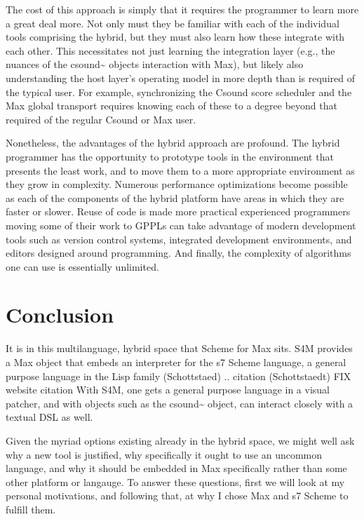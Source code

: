 \documentclass[letterpaper,10pt,english]{sphinxmanual}
\begin{document}
\sphinxAtStartPar
The cost of this approach is simply that it requires the programmer to learn
more \sphinxhyphen{} a great deal more. Not only must they be familiar with each of the individual
tools comprising the hybrid, but they must also learn how these integrate with each other.
This necessitates not just learning the integration layer (e.g., the nuances of the csound\textasciitilde{}
objects interaction with Max), but likely also understanding the host layer’s
operating model in more depth than is required of the typical user.
For example, synchronizing the Csound score scheduler and the Max global
transport requires knowing each of these to a degree beyond that required of the
regular Csound or Max user.

\sphinxAtStartPar
Nonetheless, the advantages of the hybrid approach are profound.
The hybrid programmer has the opportunity to prototype tools in the
environment that presents the least work, and to move them to a more
appropriate environment as they grow in complexity.
Numerous performance optimizations become possible as each of the
components of the hybrid platform have areas in which they are faster or slower.
Reuse of code is made more practical \sphinxhyphen{} experienced programmers
moving some of their work to GPPLs can take
advantage of modern development tools such as version control systems,
integrated development environments, and
editors designed around programming. And finally, the complexity
of algorithms one can use is essentially unlimited.


\section{Conclusion}
\label{\detokenize{background:conclusion}}
\sphinxAtStartPar
It is in this multi\sphinxhyphen{}language, hybrid space that Scheme for Max sits.
S4M provides a Max object that embeds an interpreter for
the s7 Scheme language, a general purpose language in the Lisp family (Schottstaed)
.. citation (Schottstaedt) FIX website citation
With S4M, one gets a general purpose language in a visual patcher, and
with objects such as the csound\textasciitilde{} object, can interact closely with
a textual DSL as well.

\sphinxAtStartPar
Given the myriad options existing already in the hybrid space,
we might well ask why a new tool is justified, why
specifically it ought to use an uncommon language, and why it should
be embedded in Max specifically rather than some other platform or langauge.
To answer these questions, first we will look at my personal motivations,
and following that, at why I chose Max and s7 Scheme to fulfill them.
\end{document}
